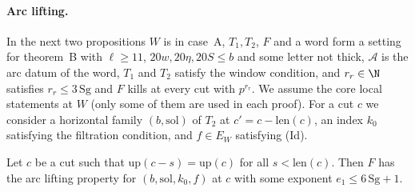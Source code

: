 \paragraph{Arc lifting.}
In the next two propositions $W$ is in case~A, $T_1,T_2$, $F$ and a word form a setting for theorem~B with $\ell\ge11$,
$20w,20\eta,20S\le b$ and some letter not thick, $\mathcal A$ is the arc datum of the word, $T_1$ and $T_2$ satisfy the
window condition, and $r_r\in\N$ satisfies $r_r\le3\,\mathrm{Sg}$ and $F$ kills at every cut with $p^{r_r}$. We assume the
core local statements at $W$ (only some of them are used in each proof). For a cut $c$ we consider a horizontal family
$(b,\mathrm{sol})$ of $T_2$ at $c'=c-\mathrm{len}(c)$, an index $k_0$ satisfying the filtration condition, and $f\in E_W$
satisfying (Id).

\begin{proposition}\label{pf:linkN-adm:single}
Let $c$ be a cut such that $\mathrm{up}(c-s)=\mathrm{up}(c)$ for all $s<\mathrm{len}(c)$. Then $F$ has the arc lifting
property for $(b,\mathrm{sol},k_0,f)$ at $c$ with some exponent $e_1\le6\,\mathrm{Sg}+1$.
\end{proposition}

